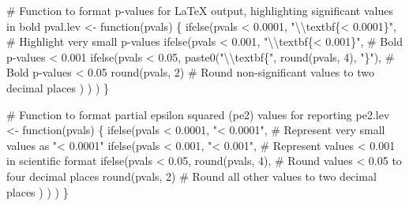 \documentclass[
  bookmarksnumbered]{article}
\newenvironment{Shaded}{\begin{snugshade}}{\end{snugshade}}
\newcommand{\CommentTok}[1]{\textcolor[rgb]{0.50,0.62,0.50}{#1}}
\newcommand{\ControlFlowTok}[1]{\textcolor[rgb]{0.94,0.87,0.69}{#1}}
\newcommand{\DecValTok}[1]{\textcolor[rgb]{0.86,0.86,0.80}{#1}}
\newcommand{\FloatTok}[1]{\textcolor[rgb]{0.75,0.75,0.82}{#1}}
\newcommand{\FunctionTok}[1]{\textcolor[rgb]{0.94,0.94,0.56}{#1}}
\newcommand{\NormalTok}[1]{\textcolor[rgb]{0.80,0.80,0.80}{#1}}
\newcommand{\OtherTok}[1]{\textcolor[rgb]{0.94,0.94,0.56}{#1}}
\newcommand{\SpecialCharTok}[1]{\textcolor[rgb]{0.86,0.64,0.64}{#1}}
\newcommand{\StringTok}[1]{\textcolor[rgb]{0.80,0.58,0.58}{#1}}
\begin{document}
\begin{Shaded}
\begin{Highlighting}[]
\CommentTok{\# Function to format p{-}values for LaTeX output, highlighting significant values in bold}
\NormalTok{pval.lev }\OtherTok{\textless{}{-}} \ControlFlowTok{function}\NormalTok{(pvals) \{}
  \FunctionTok{ifelse}\NormalTok{(pvals }\SpecialCharTok{\textless{}} \FloatTok{0.0001}\NormalTok{, }\StringTok{"}\SpecialCharTok{\textbackslash{}\textbackslash{}}\StringTok{textbf\{\textless{} 0.0001\}"}\NormalTok{, }\CommentTok{\# Highlight very small p{-}values}
    \FunctionTok{ifelse}\NormalTok{(pvals }\SpecialCharTok{\textless{}} \FloatTok{0.001}\NormalTok{, }\StringTok{"}\SpecialCharTok{\textbackslash{}\textbackslash{}}\StringTok{textbf\{\textless{} 0.001\}"}\NormalTok{, }\CommentTok{\# Bold p{-}values \textless{} 0.001}
      \FunctionTok{ifelse}\NormalTok{(pvals }\SpecialCharTok{\textless{}} \FloatTok{0.05}\NormalTok{, }\FunctionTok{paste0}\NormalTok{(}\StringTok{"}\SpecialCharTok{\textbackslash{}\textbackslash{}}\StringTok{textbf\{"}\NormalTok{, }\FunctionTok{round}\NormalTok{(pvals, }\DecValTok{4}\NormalTok{), }\StringTok{"\}"}\NormalTok{), }\CommentTok{\# Bold p{-}values \textless{} 0.05}
        \FunctionTok{round}\NormalTok{(pvals, }\DecValTok{2}\NormalTok{) }\CommentTok{\# Round non{-}significant values to two decimal places}
\NormalTok{      )}
\NormalTok{    )}
\NormalTok{  )}
\NormalTok{\}}

\CommentTok{\# Function to format partial epsilon squared (pe2) values for reporting}
\NormalTok{pe2.lev }\OtherTok{\textless{}{-}} \ControlFlowTok{function}\NormalTok{(pvals) \{}
  \FunctionTok{ifelse}\NormalTok{(pvals }\SpecialCharTok{\textless{}} \FloatTok{0.0001}\NormalTok{, }\StringTok{"\textless{} 0.0001"}\NormalTok{, }\CommentTok{\# Represent very small values as "\textless{} 0.0001"}
    \FunctionTok{ifelse}\NormalTok{(pvals }\SpecialCharTok{\textless{}} \FloatTok{0.001}\NormalTok{, }\StringTok{"\textless{} 0.001"}\NormalTok{, }\CommentTok{\# Represent values \textless{} 0.001 in scientific format}
      \FunctionTok{ifelse}\NormalTok{(pvals }\SpecialCharTok{\textless{}} \FloatTok{0.05}\NormalTok{, }\FunctionTok{round}\NormalTok{(pvals, }\DecValTok{4}\NormalTok{), }\CommentTok{\# Round values \textless{} 0.05 to four decimal places}
        \FunctionTok{round}\NormalTok{(pvals, }\DecValTok{2}\NormalTok{) }\CommentTok{\# Round all other values to two decimal places}
\NormalTok{      )}
\NormalTok{    )}
\NormalTok{  )}
\NormalTok{\}}


\end{Highlighting}
\end{Shaded}
\end{document}
